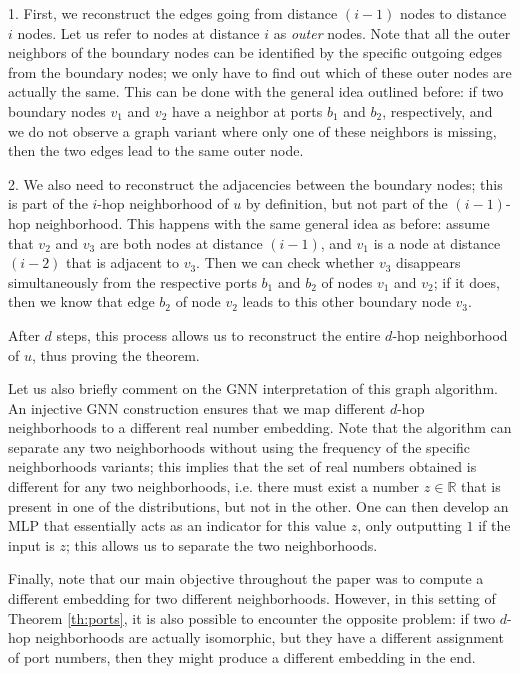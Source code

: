\documentclass{article}
\begin{document}
 1. First, we reconstruct the edges going from distance $(i-1)$ nodes to distance $i$ nodes. Let us refer to nodes at distance $i$ as \textit{outer} nodes. Note that all the outer neighbors of the boundary nodes can be identified by the specific outgoing edges from the boundary nodes; we only have to find out which of these outer nodes are actually the same. This can be done with the general idea outlined before: if two boundary nodes $v_1$ and $v_2$ have a neighbor at ports $b_1$ and $b_2$, respectively, and we do not observe a graph variant where only one of these neighbors is missing, then the two edges lead to the same outer node.

2. We also need to reconstruct the adjacencies between the boundary nodes; this is part of the $i$-hop neighborhood of $u$ by definition, but not part of the $(i-1)$-hop neighborhood. This happens with the same general idea as before: assume that $v_2$ and $v_3$ are both nodes at distance $(i-1)$, and $v_1$ is a node at distance $(i-2)$ that is adjacent to $v_3$. Then we can check whether $v_3$ disappears simultaneously from the respective ports $b_1$ and $b_2$ of nodes $v_1$ and $v_2$; if it does, then we know that edge $b_2$ of node $v_2$ leads to this other boundary node $v_3$.

After $d$ steps, this process allows us to reconstruct the entire $d$-hop neighborhood of $u$, thus proving the theorem.

Let us also briefly comment on the GNN interpretation of this graph algorithm. An injective GNN construction ensures that we map different $d$-hop neighborhoods to a different real number embedding. Note that the algorithm can separate any two neighborhoods without using the frequency of the specific neighborhoods variants; this implies that the set of real numbers obtained is different for any two neighborhoods, i.e. there must exist a number $z \in \mathbb{R}$ that is present in one of the distributions, but not in the other. One can then develop an MLP that essentially acts as an indicator for this value $z$, only outputting $1$ if the input is $z$; this allows us to separate the two neighborhoods.

Finally, note that our main objective throughout the paper was to compute a different embedding for two different neighborhoods. However, in this setting of Theorem \ref{th:ports}, it is also possible to encounter the opposite problem: if two $d$-hop neighborhoods are actually isomorphic, but they have a different assignment of port numbers, then they might produce a different embedding in the end.
\end{document}

